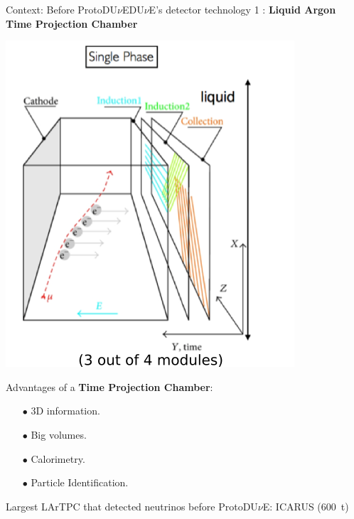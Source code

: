\documentclass[10pt]{beamer}
\begin{document}
    \begin{frame}{Context: Before \texorpdfstring{ProtoDU$\nu$E}{ProtoDUNE}}{DU$\nu$E's detector technology 1 : \textbf{Liquid Argon Time Projection Chamber}}
    	\begin{scriptsize}
    		\begin{minipage}{0.48\textwidth}
    			\includegraphics[width=\textwidth]{figures/contexte/lartpc.png}\\
    		\end{minipage}
    		\hfill
    		\begin{minipage}{0.48\textwidth}
    			Advantages of a \textbf{Time Projection Chamber}:    			
    			\begin{itemize}
    				\item[$\bullet$] 3D information.
    				\item[$\bullet$] Big volumes.
    				\item[$\bullet$] Calorimetry.
    				\item[$\bullet$] Particle Identification.
    			\end{itemize}    			
    			Largest LArTPC that detected neutrinos before ProtoDU$\nu$E: ICARUS (\SI{600}{\tonne})\\
    			

\end{minipage}
\end{scriptsize}
\end{frame}
\end{document}
